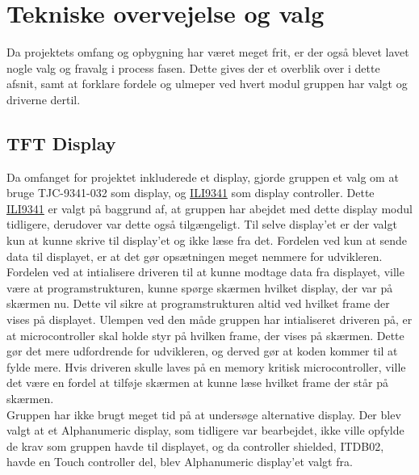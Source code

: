 \graphicspath{{Chapters/Alternative/}}


\section{Tekniske overvejelse og valg}


Da projektets omfang og opbygning har været meget frit, er der også blevet lavet nogle valg og fravalg i process fasen. Dette gives der et overblik over i dette afsnit, samt at forklare fordele og ulmeper ved hvert modul gruppen har valgt og driverne dertil. 

\subsection{TFT Display} 
Da omfanget for projektet inkluderede et display, gjorde gruppen et valg om at bruge TJC-9341-032 som display, og \href{https://blackboard.au.dk/bbcswebdav/pid-1697983-dt-content-rid-3847230_1/courses/BB-Cou-UUVA-73302/BB-Cou-UUVA-65758_ImportedContent_20170106021228/BB-Cou-STADS-UUVA-52360_ImportedContent_20160107025559/LAB/Lab3a%20Graphic%20LCD%20Display/Files%20for%20LAB3a/ILI9341_v1.11.pdf}{ILI9341} 
som display controller. Dette \href{https://blackboard.au.dk/bbcswebdav/pid-1697983-dt-content-rid-3847230_1/courses/BB-Cou-UUVA-73302/BB-Cou-UUVA-65758_ImportedContent_20170106021228/BB-Cou-STADS-UUVA-52360_ImportedContent_20160107025559/LAB/Lab3a%20Graphic%20LCD%20Display/Files%20for%20LAB3a/ILI9341_v1.11.pdf}{ILI9341} 
er valgt på baggrund af, at gruppen har abejdet med dette display modul tidligere, derudover var dette også tilgængeligt.
Til selve display'et er der valgt kun at kunne skrive til display'et og ikke læse fra det. Fordelen ved kun at sende data til displayet, er at det gør opsætningen meget nemmere for udvikleren. \\
Fordelen ved at intialisere driveren til at kunne modtage data fra displayet, ville være at programstrukturen, kunne spørge skærmen hvilket display, der var på skærmen nu. Dette vil sikre at programstrukturen altid ved hvilket frame der vises på displayet. Ulempen ved den måde gruppen har intialiseret driveren på, er at microcontroller skal holde styr på hvilken frame, der vises på skærmen. Dette gør det mere udfordrende for udvikleren, og derved gør at koden kommer til at fylde mere. Hvis driveren skulle laves på en memory kritisk microcontroller, ville det være en fordel at tilføje skærmen at kunne læse hvilket frame der står på skærmen. \\
Gruppen har ikke brugt meget tid på at undersøge alternative display. Der blev valgt at et Alphanumeric display, som tidligere var bearbejdet, ikke ville opfylde de krav som gruppen havde til displayet, og da controller shielded, ITDB02, havde en Touch controller del, blev Alphanumeric display'et valgt fra.

